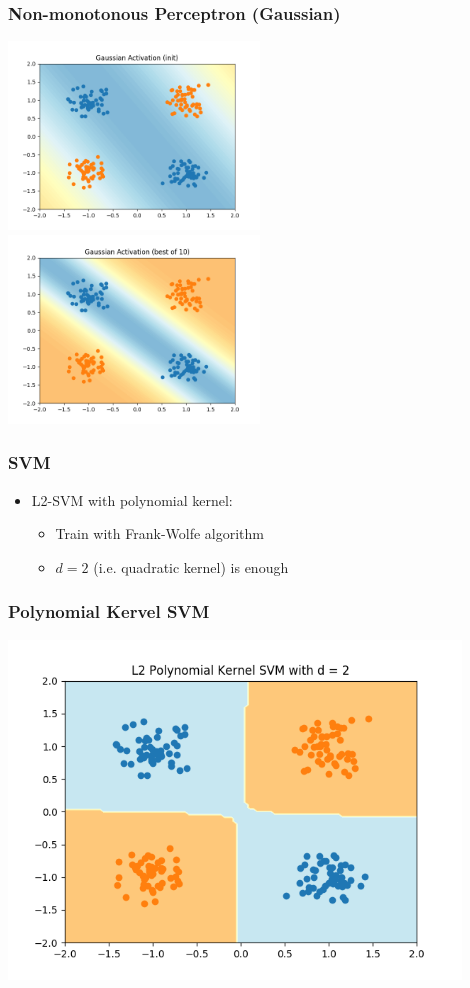 \documentclass{beamer}
\begin{document}
\begin{frame}
	\frametitle{Non-monotonous Perceptron (Gaussian)}
	\includegraphics[width=0.5\textwidth]{"graphics/Gaussian Activation (init)"}%
	\includegraphics[width=0.5\textwidth]{"graphics/Gaussian Activation (best of 10)"}
\end{frame}

\begin{frame}
	\frametitle{SVM}
	\begin{itemize}
		\item L2-SVM with polynomial kernel:
		\begin{itemize}
			\item Train with Frank-Wolfe algorithm
			\item $d=2$ (i.e. quadratic kernel) is enough	
		\end{itemize}
	\end{itemize}
\end{frame}
\begin{frame}
	\frametitle{Polynomial Kervel SVM}
	\centering
	\includegraphics[width=0.9\textwidth]{graphics/svm}%
\end{frame}
\end{document}
